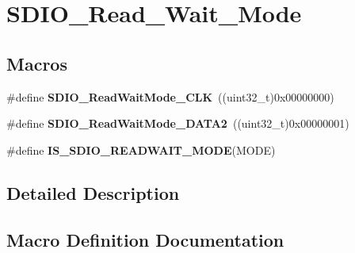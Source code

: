 \hypertarget{group___s_d_i_o___read___wait___mode}{}\section{S\+D\+I\+O\+\_\+\+Read\+\_\+\+Wait\+\_\+\+Mode}
\label{group___s_d_i_o___read___wait___mode}
\subsection*{Macros}
\begin{DoxyCompactItemize}
\item 
\hypertarget{group___s_d_i_o___read___wait___mode_ga5d73b50fed8b2589f337a6301f22f41c}{}\#define {\bfseries S\+D\+I\+O\+\_\+\+Read\+Wait\+Mode\+\_\+\+C\+L\+K}~((uint32\+\_\+t)0x00000000)\label{group___s_d_i_o___read___wait___mode_ga5d73b50fed8b2589f337a6301f22f41c}

\item 
\hypertarget{group___s_d_i_o___read___wait___mode_ga3d6952d82468b49dcc7abd5b9e02039f}{}\#define {\bfseries S\+D\+I\+O\+\_\+\+Read\+Wait\+Mode\+\_\+\+D\+A\+T\+A2}~((uint32\+\_\+t)0x00000001)\label{group___s_d_i_o___read___wait___mode_ga3d6952d82468b49dcc7abd5b9e02039f}

\item 
\#define {\bfseries I\+S\+\_\+\+S\+D\+I\+O\+\_\+\+R\+E\+A\+D\+W\+A\+I\+T\+\_\+\+M\+O\+D\+E}(M\+O\+D\+E)
\end{DoxyCompactItemize}


\subsection{Detailed Description}


\subsection{Macro Definition Documentation}
\hypertarget{group___s_d_i_o___read___wait___mode_ga35144093f5b3553a62c2248896eead4d}{}
